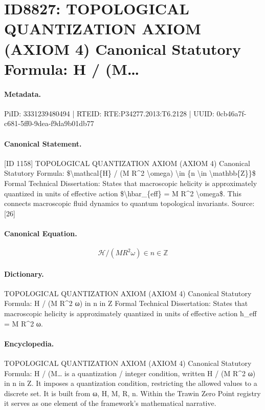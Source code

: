\section*{ID8827: TOPOLOGICAL QUANTIZATION AXIOM (AXIOM 4) Canonical Statutory Formula: H / (M…}
\paragraph{Metadata.}
PiID: 3331239480494 | RTEID: RTE:P34277.2013:T6.2128 | UUID: 0cb46a7f-c681-5ff0-9dea-f9da9b01db77

\paragraph{Canonical Statement.}
[ID 1158] TOPOLOGICAL QUANTIZATION AXIOM (AXIOM 4) Canonical Statutory Formula: \$\textbackslash{}mathcal\{H\} / (M R\textasciicircum{}2 \textbackslash{}omega) \textbackslash{}in \{n \textbackslash{}in \textbackslash{}mathbb\{Z\}\}\$ Formal Technical Dissertation: States that macroscopic helicity is approximately quantized in units of effective action \$\textbackslash{}hbar\_\{eff\} = M R\textasciicircum{}2 \textbackslash{}omega\$. This connects macroscopic fluid dynamics to quantum topological invariants. Source: [26]

\paragraph{Canonical Equation.}
\[
\mathcal{H} / (M R^2 \omega) \in {n \in \mathbb{Z}}
\]

\paragraph{Dictionary.}
TOPOLOGICAL QUANTIZATION AXIOM (AXIOM 4) Canonical Statutory Formula: H / (M R\textasciicircum{}2 ω) in n in Z Formal Technical Dissertation: States that macroscopic helicity is approximately quantized in units of effective action ħ\_eff = M R\textasciicircum{}2 ω.

\paragraph{Encyclopedia.}
TOPOLOGICAL QUANTIZATION AXIOM (AXIOM 4) Canonical Statutory Formula: H / (M… is a quantization / integer condition, written H / (M R\textasciicircum{}2 ω) in n in Z. It imposes a quantization condition, restricting the allowed values to a discrete set. It is built from ω, H, M, R, n. Within the Trawin Zero Point registry it serves as one element of the framework's mathematical narrative.

